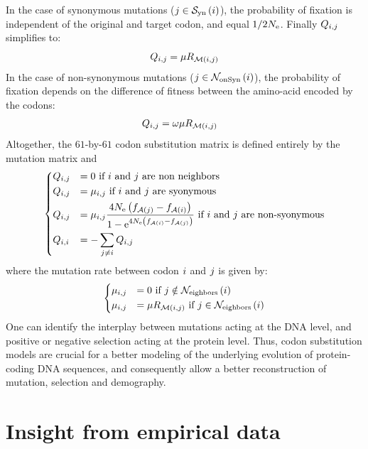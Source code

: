 In the case of synonymous mutations (${j} \in \mathcal{S}_{\mathrm{yn}}\left({i}\right) $), the probability of fixation is independent of the original and target \gls{codon}, and equal $1/2 N_{\textrm{e}}$. Finally ${Q_{{i}, {j}}}$ simplifies to: 
\begin{equation}
Q_{{i}, {j}} = \mu R_{\mathcal{M}({i}, {j})}
\end{equation}
In the case of non-synonymous mutations (${j} \in \mathcal{N}_{\mathrm{onSyn}}\left({i}\right) $), the probability of fixation depends on the difference of fitness between the amino-acid encoded by the codons:
\begin{align}
Q_{{i}, {j}} & = \omega \mu R_{\mathcal{M}({i}, {j})}
\end{align}
Altogether, the $61$-by-$61$ codon substitution matrix is defined entirely by the mutation matrix and 
\begin{equation}
\begin{dcases}
Q_{{i}, {j}} & = 0 \text{ if ${i}$ and ${j}$ are non neighbors} \\
Q_{{i}, {j}} & = \mu_{{i}, {j}} \text{ if ${i}$ and ${j}$ are syonymous} \\
Q_{{i}, {j}} & = \mu_{{i}, {j}} \dfrac{4 N_{\textrm{e}} \left({f_{\mathcal{A}({j})} - f_{\mathcal{A}({i})}}\right)}{{1 - \mathrm{e}^{4 N_{\textrm{e}} \left({f_{\mathcal{A}({i})} - f_{\mathcal{A}({j})}}\right)} }} \text{ if ${i}$ and ${j}$ are non-syonymous} \\
Q_{{i}, {i}} & = - \sum_{{j} \neq {i}} Q_{{i}, {j}}
\end{dcases}
\label{eq:codon-models}
\end{equation}
where the mutation rate between codon ${i}$ and ${j}$ is given by:
\begin{equation}
\begin{dcases}
\mu_{{i}, {j}} & = 0 \text{ if } {j} \notin \mathcal{N}_{\mathrm{eighbors}}\left({i}\right) \\
\mu_{{i}, {j}} & = \mu R_{\mathcal{M}({i}, {j})} \text{ if } {j} \in \mathcal{N}_{\mathrm{eighbors}}\left({i}\right)
\end{dcases}
\end{equation}
One can identify the interplay between mutations acting at the \acrshort{DNA} level, and positive or negative selection acting at the protein level.
Thus, \gls{codon} \gls{substitution} models are crucial for a better modeling of the underlying evolution of protein-coding \acrshort{DNA} sequences, and consequently allow a better reconstruction of mutation, selection and demography.

\section{Insight from empirical data}

